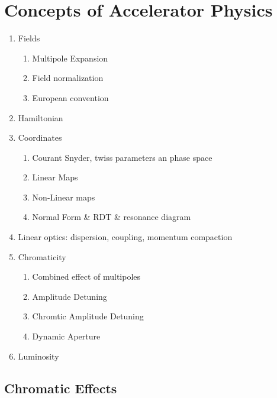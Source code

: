 \chapter{Concepts of Accelerator Physics}
\thumbforchapter{}
\chaptertoc{}
\newpage

\begin{enumerate}
    \color{red}
    \item Fields
    \begin{enumerate}
        \item Multipole Expansion
        \item Field normalization
        \item European convention
    \end{enumerate}
    \item Hamiltonian
    \item Coordinates
    \begin{enumerate}
        \item Courant Snyder, twiss parameters an phase space
        \item Linear Maps
        \item Non-Linear maps
        \item Normal Form \& RDT \& resonance diagram
    \end{enumerate}
    \item Linear optics: dispersion, coupling, momentum compaction
    \item Chromaticity

    \begin{enumerate}
        \item Combined effect of multipoles
        \item Amplitude Detuning
        \item Chromtic Amplitude Detuning
        \item Dynamic Aperture
    \end{enumerate}
    \item Luminosity
\end{enumerate}


\section{Chromatic Effects}
